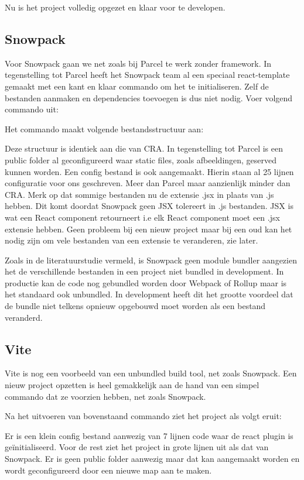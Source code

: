 Nu is het project volledig opgezet en klaar voor te developen.

\subsection{Snowpack}
Voor Snowpack gaan we net zoals bij Parcel te werk zonder framework. In tegenstelling tot Parcel heeft het Snowpack team al een speciaal react-template gemaakt met een kant en klaar commando om het te initialiseren. Zelf de bestanden aanmaken en dependencies toevoegen is dus niet nodig. Voer volgend commando uit:

Het commando maakt volgende bestandsstructuur aan:

Deze structuur is identiek aan die van CRA. In tegenstelling tot Parcel is een public folder al geconfigureerd waar static files, zoals afbeeldingen, geserved kunnen worden. Een config bestand is ook aangemaakt. Hierin staan al 25 lijnen configuratie voor ons geschreven. Meer dan Parcel maar aanzienlijk minder dan CRA. Merk op dat sommige bestanden nu de extensie .jsx in plaats van .js hebben. Dit komt doordat Snowpack geen JSX tolereert in .js bestanden. JSX is wat een React component retourneert i.e elk React component moet een .jsx extensie hebben. Geen probleem bij een nieuw project maar bij een oud kan het nodig zijn om vele bestanden van een extensie te veranderen, zie later.

Zoals in de literatuurstudie vermeld, is Snowpack geen module bundler aangezien het de verschillende bestanden in een project niet bundled in development. In productie kan de code nog gebundled worden door Webpack of Rollup maar is het standaard ook unbundled. In development heeft dit het grootte voordeel dat de bundle niet telkens opnieuw opgebouwd moet worden als een bestand veranderd. 

\subsection{Vite}
Vite is nog een voorbeeld van een unbundled build tool, net zoals Snowpack. Een nieuw project opzetten is heel gemakkelijk aan de hand van een simpel commando dat ze voorzien hebben, net zoals Snowpack. 

Na het uitvoeren van bovenstaand commando ziet het project als volgt eruit:


Er is een klein config bestand aanwezig van 7 lijnen code waar de react plugin is geïnitialiseerd. Voor de rest ziet het project in grote lijnen uit als dat van Snowpack. Er is geen public folder aanwezig maar dat kan aangemaakt worden en wordt geconfigureerd door een nieuwe map aan te maken.


